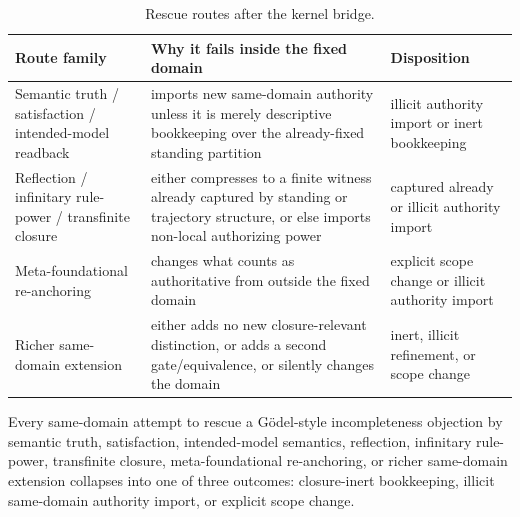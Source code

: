 \begin{table}[t]
\centering
\small
\begin{tabularx}{\textwidth}{>{\raggedright\arraybackslash}p{} >{\raggedright\arraybackslash}X >{\raggedright\arraybackslash}p{}}
\toprule
\textbf{Route family} & \textbf{Why it fails inside the fixed domain} & \textbf{Disposition}\\
\midrule
Semantic truth / satisfaction / intended-model readback & imports new same-domain authority unless it is merely descriptive bookkeeping over the already-fixed standing partition & illicit authority import or inert bookkeeping\\
Reflection / infinitary rule-power / transfinite closure & either compresses to a finite witness already captured by standing or trajectory structure, or else imports non-local authorizing power & captured already or illicit authority import\\
Meta-foundational re-anchoring & changes what counts as authoritative from outside the fixed domain & explicit scope change or illicit authority import\\
Richer same-domain extension & either adds no new closure-relevant distinction, or adds a second gate/equivalence, or silently changes the domain & inert, illicit refinement, or scope change\\
\bottomrule
\end{tabularx}
\caption{Rescue routes after the kernel bridge.}
\label{tab:rescue-routes}
\end{table}

\begin{theorem}
\label{thm:rescue-exhaustion}
Every same-domain attempt to rescue a G\"odel-style incompleteness objection by semantic truth, satisfaction, intended-model semantics, reflection, infinitary rule-power, transfinite closure, meta-foundational re-anchoring, or richer same-domain extension collapses into one of three outcomes: closure-inert bookkeeping, illicit same-domain authority import, or explicit scope change.
\end{theorem}


